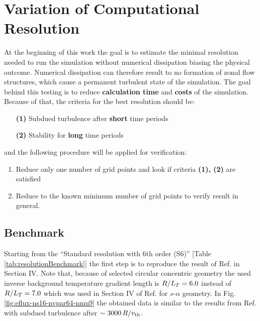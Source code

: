 \section{Variation of Computational Resolution}
\label{sec:variationsofresolution}

At the beginning of this work the goal is to estimate the minimal resolution needed to run the simulation without numerical dissipation biasing the physical outcome. Numerical dissipation can therefore result to no formation of zonal flow structures, which cause a permanent turbulent state of the simulation. The goal behind this testing is to reduce \textbf{calculation time} and \textbf{costs} of the simulation. \\
Because of that, the criteria for the best resolution should be:
\begin{enumerate}
	\item[\textbf{(1)}] Subdued turbulence after \textbf{short} time periods
	\item[\textbf{(2)}] Stability for \textbf{long} time periods 
\end{enumerate}
and the following procedure will be applied for verification:
\begin{enumerate}
	\item Reduce only one number of grid points and look if criteria \textbf{(1), (2)} are satisfied
	\item Reduce to the known minimum number of grid points to verify result in general.
\end{enumerate}

\subsection{Benchmark}
\label{sub:benchmark}

Starting from the \enquote{Standard resolution with 6th order (S6)} [Table \ref{tab:resolutionBenchmark}] the first step is to reproduce the result of Ref.  in Section IV. Note that, because of selected circular concentric geometry the used inverse background temperature gradient length is $R/L_T = 6.0$ instead of $R/L_T = 7.0$ which was used in Section IV of Ref.  for $s$-$\alpha$ geometry. In Fig. \ref{fig:eflux-ns16-nvpar64-nmu9} the obtained data is similar to the results from Ref.  with subdued turbulence after $\sim 3000\,R/v_{\mathrm{th}}$. 


